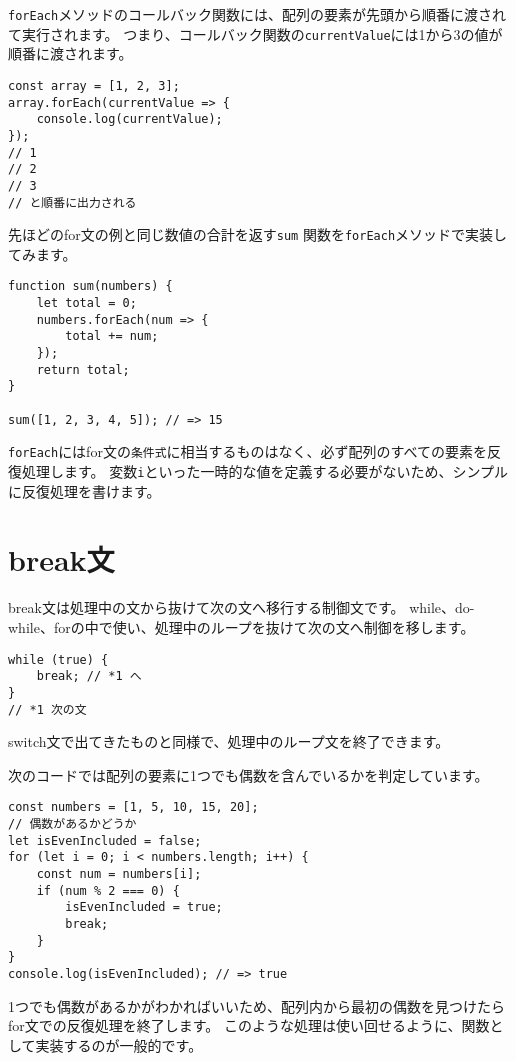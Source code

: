 \texttt{forEach}メソッドのコールバック関数には、配列の要素が先頭から順番に渡されて実行されます。
つまり、コールバック関数の\texttt{currentValue}には1から3の値が順番に渡されます。

\begin{lstlisting}
const array = [1, 2, 3];
array.forEach(currentValue => {
    console.log(currentValue);
});
// 1
// 2
// 3
// と順番に出力される
\end{lstlisting}

先ほどのfor文の例と同じ数値の合計を返す\texttt{sum}
関数を\texttt{forEach}メソッドで実装してみます。

\begin{lstlisting}
function sum(numbers) {
    let total = 0;
    numbers.forEach(num => {
        total += num;
    });
    return total;
}

sum([1, 2, 3, 4, 5]); // => 15
\end{lstlisting}

\texttt{forEach}にはfor文の\texttt{条件式}に相当するものはなく、必ず配列のすべての要素を反復処理します。
変数\texttt{i}といった一時的な値を定義する必要がないため、シンプルに反復処理を書けます。

\hypertarget{break-statement}{%
\section{break文}\label{break-statement}}

break文は処理中の文から抜けて次の文へ移行する制御文です。
while、do-while、forの中で使い、処理中のループを抜けて次の文へ制御を移します。

\begin{lstlisting}
while (true) {
    break; // *1 へ
}
// *1 次の文
\end{lstlisting}

switch文で出てきたものと同様で、処理中のループ文を終了できます。

次のコードでは配列の要素に1つでも偶数を含んでいるかを判定しています。

\begin{lstlisting}
const numbers = [1, 5, 10, 15, 20];
// 偶数があるかどうか
let isEvenIncluded = false;
for (let i = 0; i < numbers.length; i++) {
    const num = numbers[i];
    if (num % 2 === 0) {
        isEvenIncluded = true;
        break;
    }
}
console.log(isEvenIncluded); // => true
\end{lstlisting}

1つでも偶数があるかがわかればいいため、配列内から最初の偶数を見つけたらfor文での反復処理を終了します。
このような処理は使い回せるように、関数として実装するのが一般的です。

